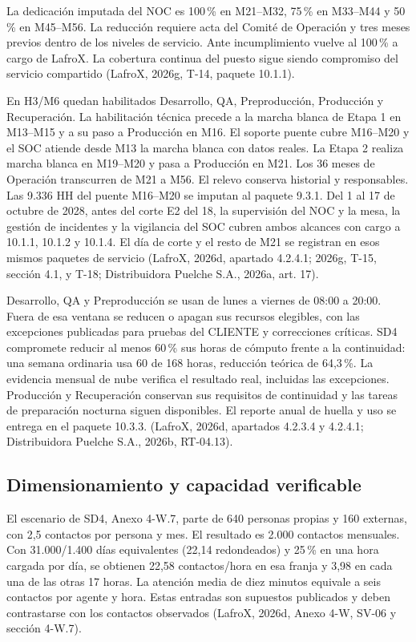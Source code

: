 La dedicación imputada del NOC es 100\,\% en M21--M32, 75\,\% en M33--M44 y 50\,\% en M45--M56. La reducción requiere acta del Comité de Operación y tres meses previos dentro de los niveles de servicio. Ante incumplimiento vuelve al 100\,\% a cargo de LafroX. La cobertura continua del puesto sigue siendo compromiso del servicio compartido (LafroX, 2026g, T-14, paquete 10.1.1).

En H3/M6 quedan habilitados Desarrollo, QA, Preproducción, Producción y Recuperación. La habilitación técnica precede a la marcha blanca de Etapa 1 en M13--M15 y a su paso a Producción en M16. El soporte puente cubre M16--M20 y el SOC atiende desde M13 la marcha blanca con datos reales. La Etapa 2 realiza marcha blanca en M19--M20 y pasa a Producción en M21. Los 36 meses de Operación transcurren de M21 a M56. El relevo conserva historial y responsables. Las 9.336 HH del puente M16--M20 se imputan al paquete 9.3.1. Del 1 al 17 de octubre de 2028, antes del corte E2 del 18, la supervisión del NOC y la mesa, la gestión de incidentes y la vigilancia del SOC cubren ambos alcances con cargo a 10.1.1, 10.1.2 y 10.1.4. El día de corte y el resto de M21 se registran en esos mismos paquetes de servicio (LafroX, 2026d, apartado 4.2.4.1; 2026g, T-15, sección 4.1, y T-18; Distribuidora Puelche S.A., 2026a, art. 17).

Desarrollo, QA y Preproducción se usan de lunes a viernes de 08:00 a 20:00. Fuera de esa ventana se reducen o apagan sus recursos elegibles, con las excepciones publicadas para pruebas del CLIENTE y correcciones críticas. SD4 compromete reducir al menos 60\,\% sus horas de cómputo frente a la continuidad: una semana ordinaria usa 60 de 168 horas, reducción teórica de 64,3\,\%. La evidencia mensual de nube verifica el resultado real, incluidas las excepciones. Producción y Recuperación conservan sus requisitos de continuidad y las tareas de preparación nocturna siguen disponibles. El reporte anual de huella y uso se entrega en el paquete 10.3.3. (LafroX, 2026d, apartados 4.2.3.4 y 4.2.4.1; Distribuidora Puelche S.A., 2026b, RT-04.13).

\subsection{Dimensionamiento y capacidad verificable}
\label{sub:sd10-capacidad}

El escenario de SD4, Anexo 4-W.7, parte de 640 personas propias y 160 externas, con 2,5 contactos por persona y mes. El resultado es 2.000 contactos mensuales. Con 31.000/1.400 días equivalentes (22,14 redondeados) y 25\,\% en una hora cargada por día, se obtienen 22,58 contactos/hora en esa franja y 3,98 en cada una de las otras 17 horas. La atención media de diez minutos equivale a seis contactos por agente y hora. Estas entradas son supuestos publicados y deben contrastarse con los contactos observados (LafroX, 2026d, Anexo 4-W, SV-06 y sección 4-W.7).

